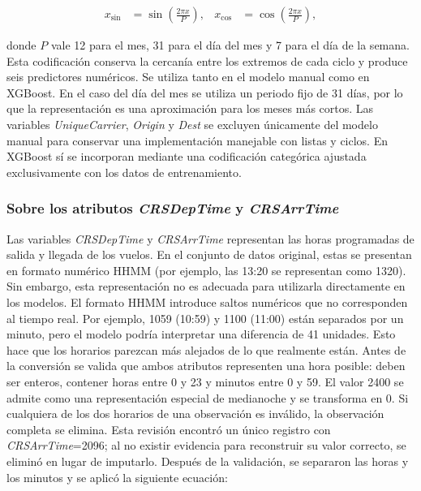 \documentclass[a4paper,12pt,twocolumn]{report}
\begin{document}
\begin{align*}
x_{\sin} &= \sin\left(\frac{2\pi x}{P}\right), &
x_{\cos} &= \cos\left(\frac{2\pi x}{P}\right),
\end{align*}

donde $P$ vale 12 para el mes, 31 para el día del mes y 7 para el día de la semana. Esta codificación conserva la cercanía entre los extremos de cada ciclo y produce seis predictores numéricos. Se utiliza tanto en el modelo manual como en XGBoost. En el caso del día del mes se utiliza un periodo fijo de 31 días, por lo que la representación es una aproximación para los meses más cortos.
\newline
Las variables \textit{UniqueCarrier}, \textit{Origin} y \textit{Dest} se excluyen únicamente del modelo manual para conservar una implementación manejable con listas y ciclos. En XGBoost sí se incorporan mediante una codificación categórica ajustada exclusivamente con los datos de entrenamiento.

\subsubsection{Sobre los atributos \textit{CRSDepTime} y \textit{CRSArrTime}}

Las variables \textit{CRSDepTime} y \textit{CRSArrTime} representan las horas programadas de salida y llegada de los vuelos. En el conjunto de datos original, estas se presentan en formato numérico HHMM (por ejemplo, las 13:20 se representan como 1320).
\newline
Sin embargo, esta representación no es adecuada para utilizarla directamente en los modelos. El formato HHMM introduce saltos numéricos que no corresponden al tiempo real. Por ejemplo, 1059 (10:59) y 1100 (11:00) están separados por un minuto, pero el modelo podría interpretar una diferencia de 41 unidades. Esto hace que los horarios parezcan más alejados de lo que realmente están.
\newline
Antes de la conversión se valida que ambos atributos representen una hora posible: deben ser enteros, contener horas entre 0 y 23 y minutos entre 0 y 59. El valor 2400 se admite como una representación especial de medianoche y se transforma en 0. Si cualquiera de los dos horarios de una observación es inválido, la observación completa se elimina. Esta revisión encontró un único registro con \textit{CRSArrTime}=2096; al no existir evidencia para reconstruir su valor correcto, se eliminó en lugar de imputarlo.
\newline
Después de la validación, se separaron las horas y los minutos y se aplicó la siguiente ecuación:
\end{document}

